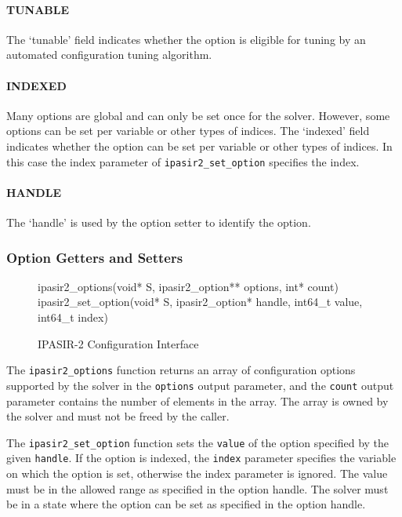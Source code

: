 \documentclass[sat]{iosart2x}
\begin{document}
\paragraph{TUNABLE}
The `tunable' field indicates whether the option is eligible for tuning by an automated configuration tuning algorithm.

\paragraph{INDEXED}
Many options are global and can only be set once for the solver.
However, some options can be set per variable or other types of indices.
The `indexed' field indicates whether the option can be set per variable or other types of indices.
In this case the index parameter of \texttt{ipasir2\_set\_option} specifies the index.

\paragraph{HANDLE}
The `handle' is used by the option setter to identify the option.

\subsubsection{Option Getters and Setters}

\begin{figure}[t]
    \tt\raggedright
    ipasir2\_options(void* S, ipasir2\_option** options, int* count)\\
    ipasir2\_set\_option(void* S, ipasir2\_option* handle, int64\_t value, int64\_t index)
    \caption{IPASIR-2 Configuration Interface}
\end{figure}

The \texttt{ipasir2\_options} function returns an array of configuration options supported by the solver in the \texttt{options} output parameter, and the \texttt{count} output parameter contains the number of elements in the array.
The array is owned by the solver and must not be freed by the caller.

The \texttt{ipasir2\_set\_option} function sets the \texttt{value} of the option specified by the given \texttt{handle}.
If the option is indexed, the \texttt{index} parameter specifies the variable on which the option is set, otherwise the index parameter is ignored.
The value must be in the allowed range as specified in the option handle.
The solver must be in a state where the option can be set as specified in the option handle.
\end{document}

